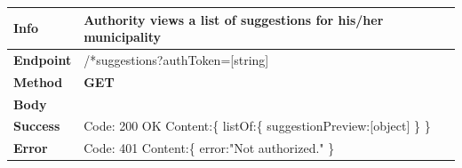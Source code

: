 


\begin{table}[H]
\begin{tabular}{|l|p{}|}
\hline
\textbf{Info}             & Authority views a list of suggestions for his/her municipality                                                               \\ \hline
\textbf{Endpoint}    &  /*suggestions?authToken=[string] \\ \hline
\textbf{Method}         &   \textbf{GET}                                                                            \\ \hline

\textbf{Body}  & 
                    \\ \hline
                    
\textbf{Success} &  Code: 200 OK \newline
                    Content:\{\newline 
                    listOf:\{\newline
                    suggestionPreview:[object]\newline
                    \}\newline
                    \}\\ \hline
                    
\textbf{Error} &  Code: 401 \newline
                  Content:\{\newline
                  error:"Not authorized." \newline\}\newline
                \\\hline

\end{tabular}
\end{table}








